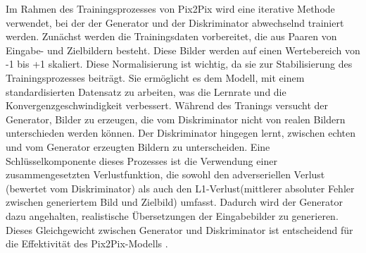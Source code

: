 Im Rahmen des Trainingsprozesses von Pix2Pix wird eine iterative Methode verwendet, bei der der Generator und der Diskriminator abwechselnd trainiert werden. Zunächst werden die Trainingsdaten vorbereitet, die aus Paaren von Eingabe- und Zielbildern besteht. Diese Bilder werden auf einen Wertebereich von -1 bis +1 skaliert. Diese Normalisierung ist wichtig, da sie zur Stabilisierung des Trainingsprozesses beiträgt. Sie ermöglicht es dem Modell, mit einem standardisierten Datensatz zu arbeiten, was die Lernrate und die Konvergenzgeschwindigkeit verbessert. Während des Tranings versucht der Generator, Bilder zu erzeugen, die vom Diskriminator nicht von realen Bildern unterschieden werden können. Der Diskriminator hingegen lernt, zwischen echten und vom Generator erzeugten Bildern zu unterscheiden. Eine Schlüsselkomponente dieses Prozesses ist die Verwendung einer zusammengesetzten Verlustfunktion, die sowohl den adverseriellen Verlust (bewertet vom Diskriminator) als auch den L1-Verlust(mittlerer absoluter Fehler zwischen generiertem Bild und Zielbild) umfasst. Dadurch wird der Generator dazu angehalten, realistische Übersetzungen der Eingabebilder zu generieren. Dieses Gleichgewicht zwischen Generator und Diskriminator ist entscheidend für die Effektivität des Pix2Pix-Modells \cite{Abdelmotaal2021}.
  

